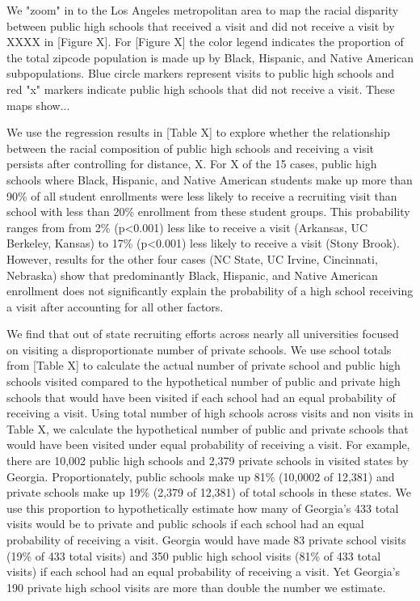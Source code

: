 \documentclass[twoside]{article}
\begin{document}
We "zoom" in to the Los Angeles metropolitan area to map the racial disparity between public high schools that received a visit and did not receive a visit by XXXX in [Figure X]. For [Figure X] the color legend indicates the proportion of the total zipcode population is made up by Black, Hispanic, and Native American subpopulations. Blue circle markers represent visits to public high schools and red "x" markers indicate public high schools that did not receive a visit. These maps show...

We use the regression results in [Table X] to explore whether the relationship between the racial composition of public high schools and receiving a visit persists after controlling for distance, X. For X of the 15 cases,  public high schools where Black, Hispanic, and Native American students make up more than 90\% of all student enrollments were less likely to receive a recruiting visit than school with less than 20\% enrollment from these student groups. This probability ranges from from 2\% (p<0.001) less like to receive a visit (Arkansas, UC Berkeley, Kansas)  to 17\% (p<0.001) less likely to receive a visit (Stony Brook). However, results for the other four cases (NC State, UC Irvine, Cincinnati, Nebraska) show that predominantly Black, Hispanic, and Native American enrollment does not significantly explain the probability of a high school receiving a visit after accounting for all other factors. 

We find that out of state recruiting efforts across nearly all universities focused on visiting a disproportionate number of private schools. We use school totals from [Table X] to calculate the actual number of private school and public high schools visited compared to the hypothetical number of public and private high schools that would have been visited if each school had an equal probability of receiving a visit. Using total number of high schools across visits and non visits in Table X, we calculate the hypothetical number of public and private schools that would have been visited under equal probability of receiving a visit. For example, there are 10,002 public high schools and 2,379 private schools in visited states by Georgia. Proportionately, public schools  make up 81\%  (10,0002 of 12,381) and private schools make up 19\% (2,379 of 12,381) of total schools in these states. We use this proportion to hypothetically estimate how many of Georgia's 433 total visits would be to private and public schools if each school had an equal probability of receiving a visit. Georgia would have made 83 private school visits (19\% of 433 total visits) and 350 public high school visits (81\% of 433 total visits) if each school had an equal probability of receiving a visit. Yet Georgia’s 190 private high school visits are more than double the number we estimate. 
\end{document}
